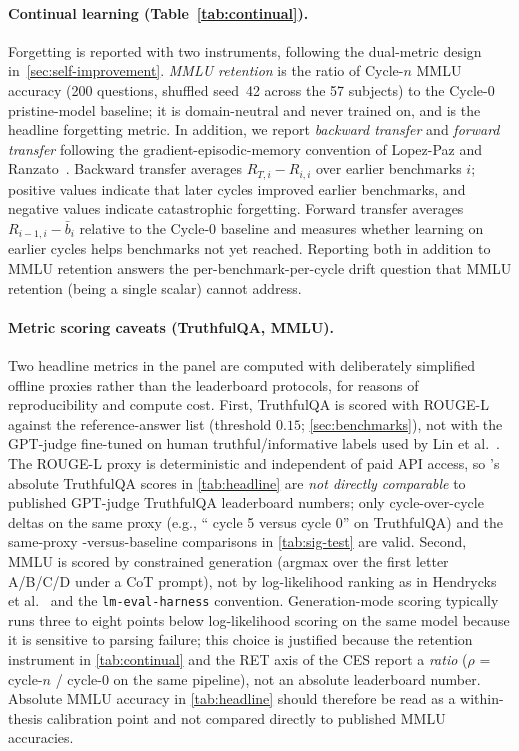 \paragraph{Continual learning (Table~\ref{tab:continual}).}
Forgetting is reported with two instruments, following the dual-metric
design in~\cref{sec:self-improvement}. \emph{MMLU retention} is the
ratio of Cycle-$n$ MMLU accuracy (200 questions, shuffled seed~42
across the 57 subjects) to the Cycle-$0$ pristine-model baseline; it
is domain-neutral and never trained on, and is the headline forgetting
metric. In addition, we report \emph{backward transfer} and
\emph{forward transfer} following the gradient-episodic-memory
convention of Lopez-Paz and
Ranzato~\cite{lopezpaz2017gradient}.
Backward transfer averages $R_{T,i} - R_{i,i}$ over earlier
benchmarks $i$; positive values indicate that later cycles improved
earlier benchmarks, and negative values indicate catastrophic
forgetting. Forward transfer averages $R_{i-1,i} - \bar b_i$ relative
to the Cycle-$0$ baseline and measures whether learning on earlier
cycles helps benchmarks not yet reached.
Reporting both in addition to MMLU retention answers
the per-benchmark-per-cycle drift question that MMLU retention (being
a single scalar) cannot address.

\paragraph{Metric scoring caveats (TruthfulQA, MMLU).}
\label{sec:metric-scoring-caveats}
Two headline metrics in the panel are computed with deliberately
simplified offline proxies rather than the leaderboard protocols, for
reasons of reproducibility and compute cost. First, TruthfulQA is
scored with ROUGE-L against the reference-answer list (threshold
$0.15$; \cref{sec:benchmarks}), not with the GPT-judge fine-tuned on
human truthful/informative labels used by Lin et
al.~\cite{lin-etal-2022-truthfulqa}. The ROUGE-L proxy is deterministic
and independent of paid API access, so \caem{}'s absolute TruthfulQA
scores in \cref{tab:headline} are \emph{not directly comparable} to
published GPT-judge TruthfulQA leaderboard numbers; only cycle-over-cycle
deltas on the same proxy (e.g., ``\caem{} cycle 5 versus cycle 0'' on
TruthfulQA) and the same-proxy \caem{}-versus-baseline comparisons in
\cref{tab:sig-test} are valid. Second, MMLU is scored by constrained
generation (argmax over the first letter A/B/C/D under a CoT prompt), not
by log-likelihood ranking as in Hendrycks et
al.~\cite{hendrycks2021measuring} and the \texttt{lm-eval-harness}
convention. Generation-mode scoring typically runs three to eight points
below log-likelihood scoring on the same model because it is sensitive
to parsing failure; this choice is justified because the retention
instrument in \cref{tab:continual} and the RET axis of the CES report a
\emph{ratio} ($\rho$ = cycle-$n$ / cycle-$0$ on the same pipeline), not
an absolute leaderboard number. Absolute MMLU accuracy in
\cref{tab:headline} should therefore be read as a within-thesis
calibration point and not compared directly to published MMLU
accuracies.

